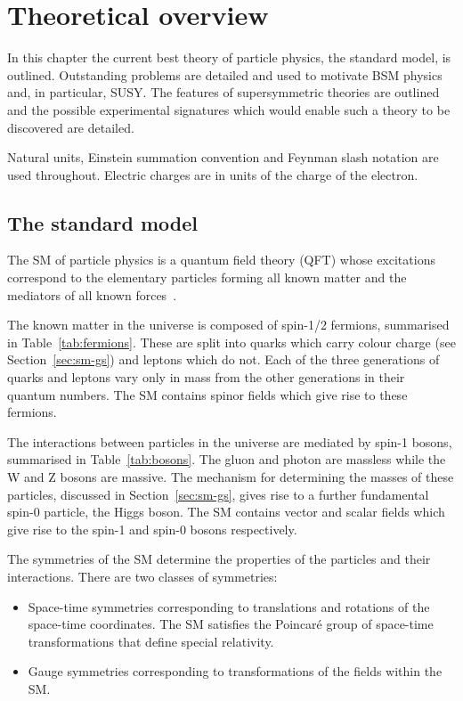 \chapter{Theoretical overview}
\label{cha:theory}

In this chapter the current best theory of particle physics, the standard model,
is outlined. Outstanding problems are detailed and used to motivate BSM 
physics and, in particular, SUSY. The features of supersymmetric theories are 
outlined and the possible experimental signatures which would enable such a theory to be 
discovered are detailed.

Natural units, Einstein summation convention
and Feynman slash notation are used throughout. Electric charges 
are in units of the charge of the electron.

\section{The standard model}

\label{sec:sm}

The SM of particle physics is a quantum field theory (QFT) whose excitations
correspond to the elementary particles forming all known matter and the mediators of
all known forces~\cite{ftsm}. 

The known matter in the universe is composed of spin-1/2 fermions, summarised 
in Table~\ref{tab:fermions}. These are split into quarks which carry colour charge 
(see Section~\ref{sec:sm-gs}) and leptons which do not. Each of the three 
generations of quarks and leptons vary only in mass from the other generations 
in their quantum numbers. The SM contains spinor
fields which give rise to these fermions.

The interactions between particles in the universe are mediated by
spin-1 bosons, summarised in Table~\ref{tab:bosons}. 
The gluon and photon are massless while the W and Z bosons are massive. 
The mechanism for determining the masses of these particles, discussed in 
Section~\ref{sec:sm-gs}, gives rise to a further fundamental spin-0 particle, the Higgs boson.
The SM contains vector and scalar fields which give rise to the spin-1 and spin-0
bosons respectively.

The symmetries of the SM determine the properties of the particles and 
their interactions. There are two classes of symmetries:

\begin{itemize}
\item Space-time symmetries corresponding to translations and rotations of the space-time coordinates.
The SM satisfies the Poincar\'{e} group of space-time transformations that define special relativity. 
\item Gauge symmetries corresponding to transformations of the fields within the SM.
\end{itemize}

